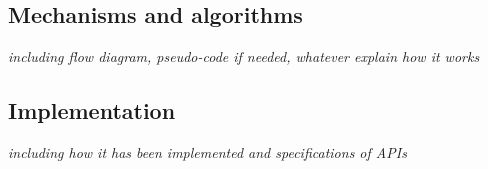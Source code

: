 
\subsection{Mechanisms and algorithms}
{\it including flow diagram, pseudo-code if needed, whatever explain how it works}

\subsection{Implementation}
{\it including how it has been implemented and specifications of APIs}
